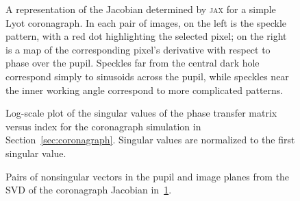 \documentclass[modern]{aastex63}
\begin{document}
\begin{figure}
\caption{A representation of the Jacobian determined by \textsc{jax} for a simple Lyot coronagraph. In each pair of images, on the left is the speckle pattern, with a red dot highlighting the selected pixel; on the right is a map of the corresponding pixel's derivative with respect to phase over the pupil. Speckles far from the central dark hole correspond simply to sinusoids across the pupil, while speckles near the inner working angle correspond to more complicated patterns.  \href{https://github.com/benjaminpope/morphine/blob/stable/notebooks/morphine_coronagraph.ipynb}{\color{linkcolor}\faGithub}
\label{speckle_jacobian}}
\end{figure}


\begin{figure}
     \caption{Log-scale plot of the singular values of the phase transfer matrix versus index for the coronagraph simulation in Section~\ref{sec:coronagraph}. Singular values are normalized to the first singular value. \href{https://github.com/benjaminpope/morphine/blob/stable/notebooks/morphine_coronagraph.ipynb}{\color{linkcolor}\faGithub}}
    \label{fig:svd_coronagraph}
\end{figure}

\begin{figure}
\caption{Pairs of nonsingular vectors in the pupil and image planes from the SVD of the coronagraph Jacobian in~\ref{speckle_jacobian}. \href{https://github.com/benjaminpope/morphine/blob/stable/notebooks/morphine_coronagraph.ipynb}{\color{linkcolor}\faGithub}
\label{nonsingular_corona}} 
\end{figure}


\end{document}
